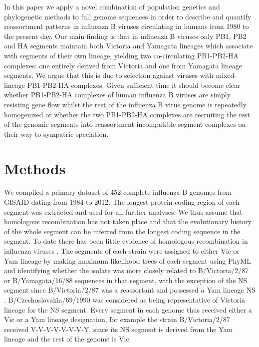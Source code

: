 \documentclass[11pt,oneside,letterpaper]{article}
\begin{document}
In this paper we apply a novel combination of population genetics and phylogenetic methods to full genome sequences in order to describe and quantify reassortment patterns in influenza B viruses circulating in humans from 1980 to the present day.
Our main finding is that in influenza B viruses only PB1, PB2 and HA segments maintain both Victoria and Yamagata lineages which associate with segments of their own lineage, yielding two co-circulating PB1-PB2-HA complexes: one entirely derived from Victoria and one from Yamagata lineage segments.
We argue that this is due to selection against viruses with mixed-lineage PB1-PB2-HA complexes.
Given sufficient time it should become clear whether PB1-PB2-HA complexes of human influenza B viruses are simply resisting gene flow whilst the rest of the influenza B virus genome is repeatedly homogenized or whether the two PB1-PB2-HA complexes are recruiting the rest of the genomic segments into reassortment-incompatible segment complexes on their way to sympatric speciation.

\newpage

\section*{Methods}
We compiled a primary dataset of 452 complete influenza B genomes from GISAID \citep{GISAID} dating from 1984 to 2012.
The longest protein coding region of each segment was extracted and used for all further analyses.
We thus assume that homologous recombination has not taken place and that the evolutionary history of the whole segment can be inferred from the longest coding sequence in the segment.
To date there has been little evidence of homologous recombination in influenza viruses \citep{chare2003,boni2008,han2010}.
The segments of each strain were assigned to either Vic or Yam lineage by making maximum likelihood trees of each segment using PhyML \citep{guindon2003} and identifying whether the isolate was more closely related to B/Victoria/2/87 or B/Yamagata/16/88 sequences in that segment, with the exception of the NS segment since B/Victoria/2/87 was a reassortant and possessed a Yam lineage NS \citep{lindstrom1999}.
B/Czechoslovakia/69/1990 was considered as being representative of Victoria lineage for the NS segment.
Every segment in each genome thus received either a Vic or a Yam lineage designation, for example the strain B/Victoria/2/87 received V-V-V-V-V-V-V-Y, since its NS segment is derived from the Yam lineage and the rest of the genome is Vic.
\end{document}
